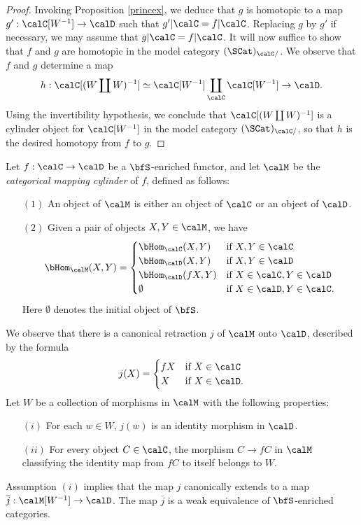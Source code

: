 \begin{Simplicial Categories}
\begin{proof}
Invoking Proposition \ref{princex}, we deduce that $g$ is homotopic to a map
$g': \calC[W^{-1}] \rightarrow \calD$ such that $g' | \calC = f | \calC$. Replacing $g$ by
$g'$ if necessary, we may assume that $g| \calC = f| \calC$. It will now suffice to show that
$f$ and $g$ are homotopic in the model category $( \SCat)_{\calC/}$. We
observe that $f$ and $g$ determine a map
$$ h: \calC[ ( W \coprod W)^{-1} ] \simeq \calC[W^{-1}] \coprod_{\calC} \calC[W^{-1}] \rightarrow \calD.$$
Using the invertibility hypothesis, we conclude that
$\calC[ (W \coprod W)^{-1}]$ is a cylinder object for
$\calC[W^{-1}]$ in the model category $( \SCat)_{\calC/}$, so that $h$ is the desired
homotopy from $f$ to $g$. 
\end{proof}

\begin{lemma}\label{swimcase}
Let $f: \calC \rightarrow \calD$ be a $\bfS$-enriched functor, and let
$\calM$ be the {\it categorical mapping cylinder} of $f$, defined as follows:
\begin{itemize}
\item[$(1)$] An object of $\calM$ is either an object of $\calC$ or an object of $\calD$.
\item[$(2)$] Given a pair of objects $X,Y \in \calM$, we have
$$ \bHom_{\calM}(X,Y) = \begin{cases} \bHom_{\calC}(X,Y) & \text{if } X,Y \in \calC \\
\bHom_{\calD}( X,Y) & \text{if } X,Y \in \calD \\
\bHom_{\calD}( fX, Y) & \text{if } X \in \calC, Y \in \calD \\
\emptyset & \text{if } X \in \calD, Y \in \calC. \end{cases} $$
Here $\emptyset$ denotes the initial object of $\bfS$.
\end{itemize}
We observe that there is a canonical retraction $j$ of $\calM$ onto $\calD$, described by the formula $$j(X) = \begin{cases} fX & \text{if } X \in \calC \\
X & \text{if } X \in \calD. \end{cases}$$
Let $W$ be a collection of morphisms in $\calM$ with the following properties:
\begin{itemize}
\item[$(i)$] For each $w \in W$, $j(w)$ is an identity morphism in $\calD$.
\item[$(ii)$] For every object $C \in \calC$, the morphism $C \rightarrow fC$
in $\calM$ classifying the identity map from $fC$ to itself belongs to $W$.
\end{itemize}
Assumption $(i)$ implies that the map $j$ canonically extends to a map
$\overline{j}: \calM[W^{-1}] \rightarrow \calD$. The map $\overline{j}$
is a weak equivalence of $\bfS$-enriched categories.
\end{lemma}


\end{Simplicial Categories}
